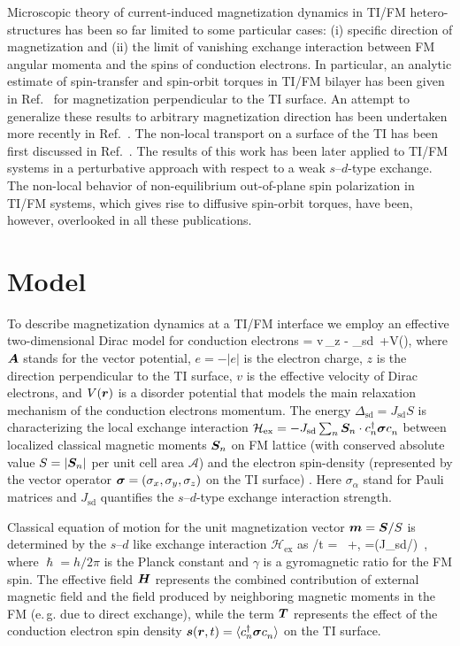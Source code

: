 Microscopic theory of current-induced magnetization dynamics in TI/FM hetero-structures has been so far limited to some particular cases: (i) specific direction of magnetization and (ii) the limit of vanishing exchange interaction between FM angular momenta and the spins of conduction electrons.  In particular, an analytic estimate of spin-transfer and spin-orbit torques in TI/FM bilayer has been given in Ref.~\cite{sakai_spin_2014} for magnetization perpendicular to the TI surface. An attempt to generalize these results to arbitrary magnetization direction has been undertaken more recently in Ref.~\cite{ndiaye_dirac_2017}.  The non-local transport on a surface of the TI has been first discussed in Ref.~\cite{burkov_spin_2010-1}. The results of this work has been later applied to TI/FM systems \cite{taguchi_spin-charge_2015,shintani_spin_2016} in a perturbative approach with respect to a weak $s$--$d$-type exchange. The non-local behavior of non-equilibrium out-of-plane spin polarization in TI/FM systems, which gives rise to diffusive spin-orbit torques, have been, however, overlooked in all these publications. 

\section{Model}
To describe magnetization dynamics at a TI/FM interface we employ an effective two-dimensional Dirac model for conduction electrons 
\be
\label{TImodel}
= v\,_z - \Delta_\textrm{sd}\, \cdot \bb{\sigma} +V(),
\e
where $\boldsymbol{A}$ stands for the vector potential, $e=-|e|$ is the electron charge, $z$ is the direction perpendicular to the TI surface, $v$ is the effective velocity of Dirac electrons, and $V(\boldsymbol{r})$ is a disorder potential that models the main relaxation mechanism of the conduction electrons momentum. The energy $\Delta_{\textrm{sd}}=J_\textrm{sd} S$ is characterizing the local exchange interaction $\mathcal{H}_\textrm{ex}=-J_\textrm{sd} \sum_n  \bb{S}_n \cdot c\h_n \bb{\sigma}c\0_n$ between localized classical magnetic moments $\boldsymbol{S}_n$ on FM lattice (with conserved absolute value $S=|\boldsymbol{S}_n|$ per unit cell area $\mathcal{A}$) and the electron spin-density  (represented by the vector operator $\boldsymbol{\sigma} = (\sigma_x,\sigma_y,\sigma_z)$ on the TI surface) \cite{sdmodel}. Here $\sigma_\alpha$ stand for Pauli matrices and $J_\textrm{sd}$ quantifies the $s$--$d$-type exchange interaction strength.  

Classical equation of motion for the unit magnetization vector $\boldsymbol{m}=\boldsymbol{S}/S$ is determined by the $s$--$d$ like exchange interaction $\mathcal{H}_\textrm{ex}$ as
\be
\label{Eom}
\pa {}/\pa t = \gamma\,  \times{}+,\quad
{}=(J_\textrm{sd}/\hslash) \,\times{},
\e
where $\hslash=h/2\pi$ is the Planck constant and $\gamma$ is a gyromagnetic ratio for the FM spin. The effective field $\boldsymbol{H}$ represents the combined contribution of external magnetic field and the field produced by neighboring magnetic moments in the FM (e.\,g. due to direct exchange), while the term $\boldsymbol{T}$ represents the effect of the conduction electron spin density $\bb{s}(\bb{r},t)= \la c\h_n \bb{\sigma} c\0_n\ra$  on the TI surface. 


